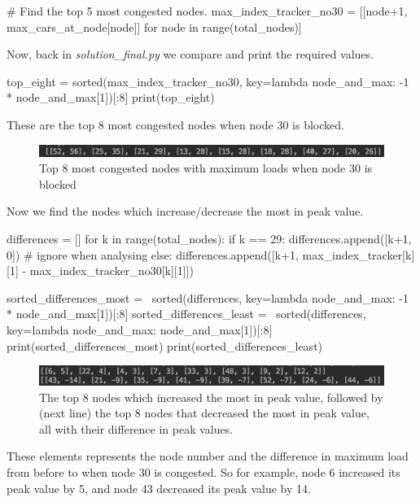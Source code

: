 \documentclass[paper=a4, fontsize=12pt]{scrartcl} %
\numberwithin{equation}{section}       %
\numberwithin{figure}{section}         %
\numberwithin{table}{section}          %
\begin{document}
\begin{enumerate}
\begin{python}
# Find the top 5 most congested nodes.
max_index_tracker_no30 = [[node+1, max_cars_at_node[node]]
                          for node in range(total_nodes)]
\end{python}

Now, back in \textit{solution\_final.py} we compare and print the required values.

\begin{python}
top_eight = sorted(max_index_tracker_no30, 
                       key=lambda node_and_max: -1 * node_and_max[1])[:8]
print(top_eight)
\end{python}

These are the top 8 most congested nodes when node 30 is blocked.

\begin{figure}[h]
\caption{Top 8 most congested nodes with maximum loads when node 30 is blocked}
\centering
\includegraphics[width=1.1\textwidth]{30block}
\end{figure}

\leavevmode
\newline



Now we find the nodes which increase/decrease the most in peak value.

\begin{python}
    differences = []
    for k in range(total_nodes):
        if k == 29:
            differences.append([k+1, 0])  # ignore when analysing
        else:
            differences.append([k+1, max_index_tracker[k][1] 
                                - max_index_tracker_no30[k][1]])

    sorted_differences_most = \
        sorted(differences, 
               key=lambda node_and_max: -1 * node_and_max[1])[:8]
    sorted_differences_least = \
        sorted(differences, 
               key=lambda node_and_max: node_and_max[1])[:8]
    print(sorted_differences_most)
    print(sorted_differences_least)
\end{python}

\begin{figure}[h]
\caption{The top 8 nodes which increased the most in peak value, followed by (next line) the top 8 nodes that decreased the most in peak value, all with their difference in peak values.}
\centering
\includegraphics[width=1.1\textwidth]{top8}
\end{figure}

These elements represents the node number and the difference in maximum load from before to when node 30 is congested. So for example, node 6 increased its peak value by 5, and node 43 decreased its peak value by 14.



\end{enumerate}
\end{document}
